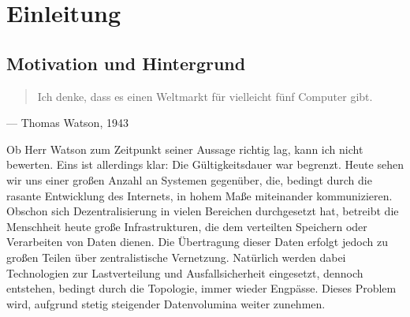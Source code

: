 
\chapter{Einleitung}
\section{Motivation und Hintergrund}

\begin{quote}
\glqq Ich denke, dass es einen Weltmarkt für vielleicht fünf Computer gibt.\grqq
\end{quote}
\begin{flushright}
--- \textup{Thomas Watson, 1943}
\end{flushright}

Ob Herr Watson zum Zeitpunkt seiner Aussage richtig lag, kann ich nicht bewerten. Eins ist allerdings klar: Die Gültigkeitsdauer war begrenzt. Heute sehen wir uns einer großen Anzahl an Systemen gegenüber, die, bedingt durch die rasante Entwicklung des Internets, in hohem Maße miteinander kommunizieren. Obschon sich Dezentralisierung in vielen Bereichen durchgesetzt hat, betreibt die Menschheit heute große Infrastrukturen, die dem verteilten Speichern oder Verarbeiten von Daten dienen. Die Übertragung dieser Daten erfolgt jedoch zu großen Teilen über zentralistische Vernetzung. Natürlich werden dabei Technologien zur Lastverteilung und Ausfallsicherheit eingesetzt, dennoch entstehen, bedingt durch die Topologie, immer wieder Engpässe. Dieses Problem wird, aufgrund stetig steigender Datenvolumina weiter zunehmen.\newline

